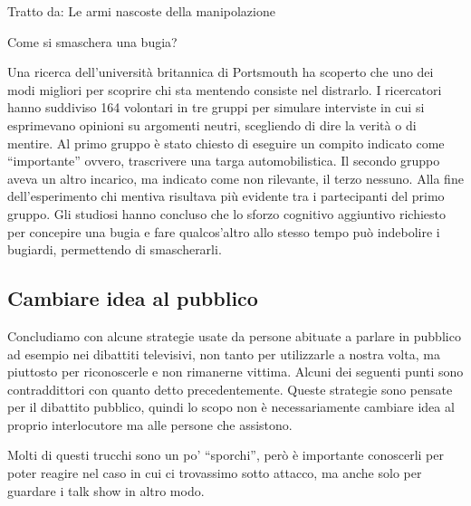 \documentclass[12pt]{book} %
\begin{document}
\bigskip

Tratto da: Le armi nascoste della manipolazione


\bigskip
\begin{mdframed}[linewidth=1pt]
Come si smaschera una bugia?


\bigskip

Una ricerca dell'università britannica di Portsmouth ha scoperto che uno dei modi migliori per scoprire chi sta mentendo
consiste nel distrarlo. I ricercatori hanno suddiviso 164 volontari in tre gruppi per simulare interviste in cui si
esprimevano opinioni su argomenti neutri, scegliendo di dire la verità o di mentire. Al primo gruppo è stato chiesto di
eseguire un compito indicato come “importante” ovvero, trascrivere una targa automobilistica. Il secondo gruppo aveva
un altro incarico, ma indicato come non rilevante, il terzo nessuno. Alla fine dell'esperimento
chi mentiva risultava più evidente tra i partecipanti del primo gruppo. Gli studiosi hanno concluso che lo sforzo
cognitivo aggiuntivo richiesto per concepire una bugia e fare qualcos'altro allo stesso tempo può indebolire i
bugiardi, permettendo di smascherarli.
\end{mdframed}

\subsection{Cambiare idea al pubblico}
Concludiamo con alcune strategie usate da persone abituate a parlare in pubblico ad esempio nei dibattiti televisivi,
non tanto per utilizzarle a nostra volta, ma piuttosto per riconoscerle e non rimanerne vittima. Alcuni dei seguenti
punti sono contraddittori con quanto detto precedentemente. Queste strategie sono pensate per il dibattito pubblico,
quindi lo scopo non è necessariamente cambiare idea al proprio interlocutore ma alle persone che assistono. 

Molti di questi trucchi sono un po' “sporchi”, però è importante conoscerli per poter reagire nel
caso in cui ci trovassimo sotto attacco, ma anche solo per guardare i talk show in altro modo.


\bigskip
\end{document}
